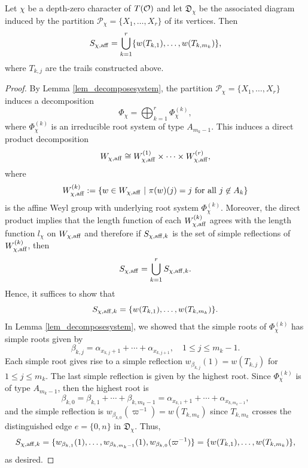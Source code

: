     \begin{proposition}\label{prop_Schi}
        Let $\chi$ be a depth-zero character of $T(\mathcal{O})$ and let $\mathfrak{D}_\chi$ be the associated diagram induced by the partition $\mathcal{P}_\chi=\{X_1,\ldots,X_r\}$ of its vertices. Then
        \begin{equation*}
            S_{\chi,\mathrm{aff}}=\bigcup_{k=1}^r \{w(T_{k,1}),\ldots,w(T_{k,m_k})\},
        \end{equation*}
        where $T_{k,j}$ are the trails constructed above. 
    \end{proposition}

    \begin{proof}

        By Lemma \ref{lem_decomposesystem}, the partition $\mathcal{P}_\chi=\{X_1,\ldots,X_r\}$ induces a decomposition 
        $$\Phi_\chi=\bigoplus_{k=1}^r\Phi_\chi^{(k)},$$
        where $\Phi_\chi^{(k)}$ is an irreducible root system of type $A_{m_k-1}$. This induces a direct product decomposition
        $$W_{\chi,\mathrm{aff}}\cong W_{\chi,\mathrm{aff}}^{(1)}\times\cdots\times W_{\chi,\mathrm{aff}}^{(r)},$$
        where 
        $$W_{\chi,\mathrm{aff}}^{(k)}:=\{w\in W_{\chi,\mathrm{aff}}\ |\ \pi(w)(j)=j\text{ for all }j\not\in A_k\}$$
        is the affine Weyl group with underlying root system $\Phi_\chi^{(k)}$.
        Moreover, the direct product implies that the length function of each $W_{\chi,\mathrm{aff}}^{(k)}$ agrees with the length function $l_\chi$ on $W_{\chi,\mathrm{aff}}$ and therefore if $S_{\chi,\mathrm{aff},k}$ is the set of simple reflections of $W_{\chi,\mathrm{aff}}^{(k)}$, then
        $$S_{\chi,\mathrm{aff}}=\bigcup_{k=1}^r S_{\chi,\mathrm{aff},k}.$$
        Hence, it suffices to show that 
        $$S_{\chi,\mathrm{aff},k}=\{w(T_{k,1}),\ldots,w(T_{k,m_k})\}.$$
        In Lemma \ref{lem_decomposesystem}, we showed that the simple roots of $\Phi_\chi^{(k)}$ has simple roots given by 
        $$\beta_{k,j}=\alpha_{x_{k,j}+1}+\cdots+\alpha_{x_{k,j+1}},\quad 1\leq j\leq m_k-1.$$
        Each simple root gives rise to a simple reflection $w_{\beta_{k,j}}(1)=w(T_{k,j})$ for $1\leq j\leq m_k$. The last simple reflection is given by the highest root. Since $\Phi_\chi^{(k)}$ is of type $A_{m_k-1}$, then the highest root is 
        $$\beta_{k,0}=\beta_{k,1}+\cdots+\beta_{k,m_k-1}=\alpha_{x_{k,1}+1}+\cdots+\alpha_{x_{k,m_k-1}},$$
        and the simple reflection is $w_{\beta_{k,0}}(\varpi^{-1})=w(T_{k,m_k})$ since $T_{k,m_k}$ crosses the distinguished edge $e=\{0,n\}$ in $\mathfrak{D}_\chi$. Thus,
        $$S_{\chi,\mathrm{aff},k}=\{w_{\beta_{k,1}}(1),\ldots,w_{\beta_{k,m_k-1}}(1),w_{\beta_{k,0}}(\varpi^{-1})\}=\{w(T_{k,1}),\ldots,w(T_{k,m_k})\},$$
        as desired.
    \end{proof}
        
